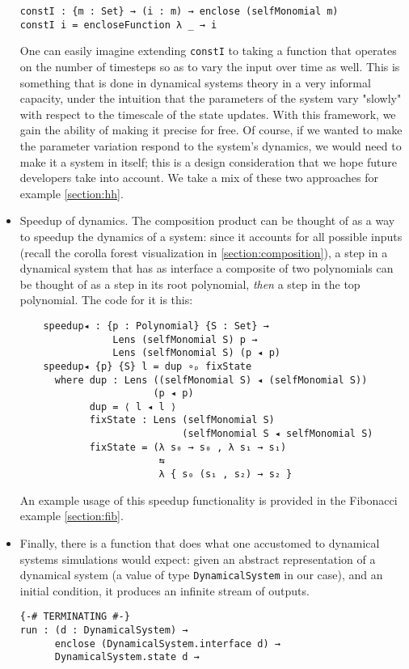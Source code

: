 \begin{itemize}
\begin{verbatim}
constI : {m : Set} → (i : m) → enclose (selfMonomial m)
constI i = encloseFunction λ _ → i
\end{verbatim}
    One can easily imagine extending \texttt{constI} to taking a function that operates on the number of timesteps so as to vary the input over time as well. This is something that is done in dynamical systems theory in a very informal capacity, under the intuition that the parameters of the system vary "slowly" with respect to the timescale of the state updates. With this framework, we gain the ability of making it precise for free. Of course, if we wanted to make the parameter variation respond to the system's dynamics, we would need to make it a system in itself; this is a design consideration that we hope future developers take into account. We take a mix of these two approaches for example \ref{section:hh}.
    \item Speedup of dynamics. The composition product can be thought of as a way to speedup the dynamics of a system: since it accounts for all possible inputs (recall the corolla forest visualization in \ref{section:composition}), a step in a dynamical system that has as interface a composite of two polynomials can be thought of as a step in its root polynomial, \textit{then} a step in the top polynomial. The code for it is this:
\begin{verbatim}
    speedup◂ : {p : Polynomial} {S : Set} → 
                Lens (selfMonomial S) p → 
                Lens (selfMonomial S) (p ◂ p)
    speedup◂ {p} {S} l = dup ∘ₚ fixState
      where dup : Lens ((selfMonomial S) ◂ (selfMonomial S))
                       (p ◂ p)
            dup = ⟨ l ◂ l ⟩
            fixState : Lens (selfMonomial S)
                            (selfMonomial S ◂ selfMonomial S)
            fixState = (λ s₀ → s₀ , λ s₁ → s₁) 
                        ⇆ 
                        λ { s₀ (s₁ , s₂) → s₂ } 
\end{verbatim} 
    An example usage of this speedup functionality is provided in the Fibonacci example \ref{section:fib}.
    \item Finally, there is a function that does what one accustomed to dynamical systems simulations would expect: given an abstract representation of a dynamical system (a value of type \texttt{DynamicalSystem} in our case), and an initial condition, it produces an infinite stream of outputs.
\begin{verbatim}
{-# TERMINATING #-}
run : (d : DynamicalSystem) → 
      enclose (DynamicalSystem.interface d) → 
      DynamicalSystem.state d → 

\end{verbatim}
\end{itemize}
